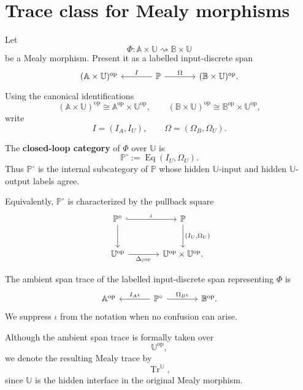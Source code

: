 \section{Trace class for Mealy morphisms}
\label{sec:trace-class-mealy-morphisms}

Let
\[
\Phi:
\mathbb A\times\mathbb U
\rightsquigarrow
\mathbb B\times\mathbb U
\]
be a Mealy morphism.  Present it as a labelled input-discrete span
\[
\begin{tikzcd}[column sep=large]
(\mathbb A\times\mathbb U)^{\mathrm{op}}
&
\mathbb P
  \arrow[l, "I"']
  \arrow[r, "\Omega"]
&
(\mathbb B\times\mathbb U)^{\mathrm{op}} .
\end{tikzcd}
\]
Using the canonical identifications
\[
(\mathbb A\times\mathbb U)^{\mathrm{op}}
\cong
\mathbb A^{\mathrm{op}}\times\mathbb U^{\mathrm{op}},
\qquad
(\mathbb B\times\mathbb U)^{\mathrm{op}}
\cong
\mathbb B^{\mathrm{op}}\times\mathbb U^{\mathrm{op}},
\]
write
\[
I=(I_A,I_U),
\qquad
\Omega=(\Omega_B,\Omega_U).
\]

\begin{definition}
\label{def:closed-loop-category}
The \textbf{closed-loop category} of \(\Phi\) over \(\mathbb U\) is
\[
\mathbb P^\circ
:=
\operatorname{Eq}(I_U,\Omega_U).
\]
Thus \(\mathbb P^\circ\) is the internal subcategory of \(\mathbb P\) whose
hidden \(\mathbb U\)-input and hidden \(\mathbb U\)-output labels agree.
\end{definition}

Equivalently, \(\mathbb P^\circ\) is characterized by the pullback square
\[
\begin{tikzcd}[column sep=large,row sep=large]
\mathbb P^\circ
  \arrow[r, hook, "\iota"]
  \arrow[d]
&
\mathbb P
  \arrow[d, "{(I_U,\Omega_U)}"]
\\
\mathbb U^{\mathrm{op}}
  \arrow[r, "\Delta_{\mathbb U^{\mathrm{op}}}"']
&
\mathbb U^{\mathrm{op}}\times\mathbb U^{\mathrm{op}} .
\end{tikzcd}
\]

The ambient span trace of the labelled input-discrete span representing
\(\Phi\) is
\[
\begin{tikzcd}[column sep=large]
\mathbb A^{\mathrm{op}}
&
\mathbb P^\circ
  \arrow[l, "I_A\iota"']
  \arrow[r, "\Omega_B\iota"]
&
\mathbb B^{\mathrm{op}} .
\end{tikzcd}
\]
We suppress \(\iota\) from the notation when no confusion can arise.

Although the ambient span trace is formally taken over
\[
\mathbb U^{\mathrm{op}},
\]
we denote the resulting Mealy trace by
\[
\operatorname{Tr}^{\mathbb U},
\]
since \(\mathbb U\) is the hidden interface in the original Mealy morphism.

